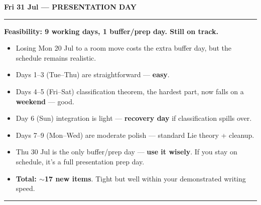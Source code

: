 \documentclass[11pt]{article}
\begin{document}
\begin{center}
{\Large\bfseries \textcolor{deadline}{Fri 31 Jul --- PRESENTATION DAY}}
\end{center}

\vspace{0.5em}
\hrule
\vspace{1em}

{\large\bfseries Feasibility: 9 working days, 1 buffer/prep day. Still on track.}

\begin{itemize}[nosep]
  \item Losing Mon 20 Jul to a room move costs the extra buffer day, but the schedule remains realistic.
  \item Days 1--3 (Tue--Thu) are straightforward --- \textbf{easy}.
  \item Days 4--5 (Fri--Sat) classification theorem, the hardest part, now falls on a \textbf{weekend} --- good.
  \item Day 6 (Sun) integration is light --- \textbf{recovery day} if classification spills over.
  \item Days 7--9 (Mon--Wed) are moderate polish --- standard Lie theory + cleanup.
  \item Thu 30 Jul is the only buffer/prep day --- \textbf{use it wisely}. If you stay on schedule, it's a full presentation prep day.
  \item \textbf{Total: $\sim$17 new items}. Tight but well within your demonstrated writing speed.
\end{itemize}

\vspace{0.5em}
\hrule
\end{document}
